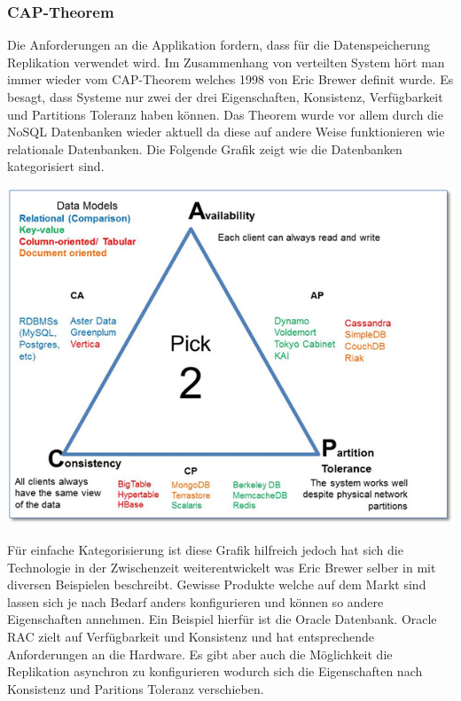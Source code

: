 \subsubsection{CAP-Theorem}
Die Anforderungen an die Applikation fordern, dass für die Datenspeicherung Replikation verwendet wird. Im Zusammenhang von verteilten System hört man immer wieder vom CAP-Theorem welches 1998 von Eric Brewer definit wurde. Es besagt, dass Systeme nur zwei der drei Eigenschaften, Konsistenz, Verfügbarkeit und Partitions Toleranz haben können. Das Theorem wurde vor allem durch die NoSQL Datenbanken wieder aktuell da diese auf andere Weise funktionieren wie relationale Datenbanken. Die Folgende Grafik zeigt wie die Datenbanken kategorisiert sind.
\begin{center}
	\includegraphics[scale=0.60]{cap.png}\newline
	\cite{cap}
\end{center}
Für einfache Kategorisierung ist diese Grafik hilfreich jedoch hat sich die Technologie in der Zwischenzeit weiterentwickelt was Eric Brewer selber in \cite{capnew} mit diversen Beispielen beschreibt. Gewisse Produkte welche auf dem Markt sind lassen sich je nach Bedarf anders konfigurieren und können so andere Eigenschaften annehmen. Ein Beispiel hierfür ist die Oracle Datenbank. Oracle RAC zielt auf Verfügbarkeit und Konsistenz und hat entsprechende Anforderungen an die Hardware. Es gibt aber auch die Möglichkeit die Replikation asynchron zu konfigurieren wodurch sich die Eigenschaften nach Konsistenz und Paritions Toleranz verschieben. 

